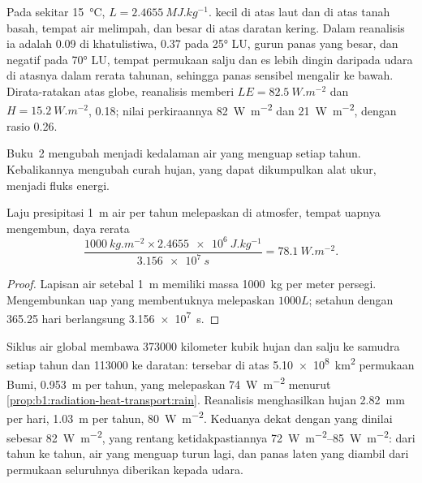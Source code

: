 Pada sekitar \qty{15}{\celsius}, $L = \qty{2.4655}{MJ.kg^{-1}}$.  kecil
di atas laut dan di atas tanah basah, tempat air melimpah, dan besar di atas daratan kering.
Dalam reanalisis ia adalah \num{0.09} di khatulistiwa, \num{0.37} pada \ang{25} LU,
 gurun panas yang besar, dan negatif pada \ang{70} LU, tempat permukaan salju
dan es lebih dingin daripada udara di atasnya dalam rerata tahunan, sehingga panas
sensibel mengalir ke bawah. Dirata-ratakan atas globe, reanalisis memberi $LE =
\qty{82.5}{W.m^{-2}}$ dan $H = \qty{15.2}{W.m^{-2}}$,  \num{0.18};
nilai perkiraannya \qty{82}{W.m^{-2}} dan \qty{21}{W.m^{-2}}, dengan rasio
\num{0.26}.

Buku~2 mengubah  menjadi kedalaman air yang menguap setiap tahun. Kebalikannya mengubah curah hujan, yang dapat dikumpulkan alat ukur, menjadi fluks energi.

\begin{proposition}\label{prop:b1:radiation-heat-transport:rain}
Laju presipitasi \qty{1}{m} air per tahun melepaskan di atmosfer, tempat uapnya mengembun, daya rerata
\[
  \frac{\qty{1000}{kg.m^{-2}} \times \qty{2.4655e6}{J.kg^{-1}}}{\qty{3.156e7}{s}}
  = \qty{78.1}{W.m^{-2}} .
\]
\end{proposition}

\begin{proof}
Lapisan air setebal \qty{1}{m} memiliki massa \qty{1000}{kg} per meter persegi. Mengembunkan uap yang membentuknya melepaskan $1000L$; setahun dengan \num{365.25} hari berlangsung \qty{3.156e7}{s}.
\end{proof}

\begin{example}\label{ex:b1:radiation-heat-transport:rain}
Siklus air global membawa \num{373000} kilometer kubik hujan dan salju ke samudra setiap
tahun dan \num{113000} ke daratan: tersebar di atas \qty{5.10e8}{km^2} permukaan Bumi,
\qty{0.953}{m} per tahun, yang melepaskan \qty{74}{W.m^{-2}} menurut
\cref{prop:b1:radiation-heat-transport:rain}. Reanalisis menghasilkan hujan
\qty{2.82}{mm} per hari, \qty{1.03}{m} per tahun, \qty{80}{W.m^{-2}}. Keduanya dekat
dengan  yang dinilai sebesar \qty{82}{W.m^{-2}}, yang rentang
ketidakpastiannya \qtyrange{72}{85}{W.m^{-2}}: dari tahun ke tahun, air yang menguap
turun lagi, dan panas laten yang diambil dari permukaan seluruhnya diberikan kepada udara.
\end{example}

